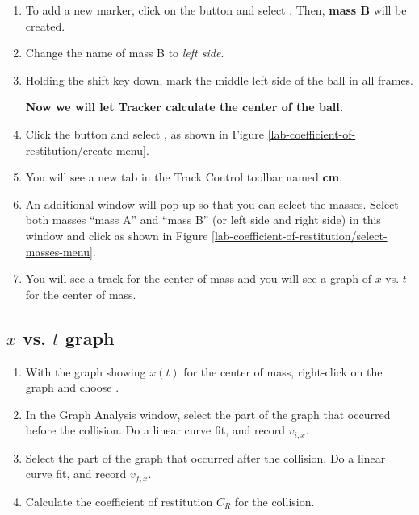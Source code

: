 \begin{enumerate}

	{\bf Now we will mark the left side of the ball.}
	
	\item To add a new marker, click on the  button and select . Then, {\bf mass B} will be created. 
			
	\item Change the name of mass B to \emph{left side}.

	\item Holding the shift key down, mark the middle left side of the ball in all frames.
	
	{\bf Now we will let Tracker calculate the center of the ball.}

	\item  Click the  button and select , as shown in Figure \ref{lab-coefficient-of-restitution/create-menu}.
	

	\item You will see a new tab in the Track Control toolbar named {\bf cm}.
	
	\item An additional window will pop up so that you can select the masses. Select both masses ``mass A'' and ``mass B'' (or left side and right side) in this window and click  as shown in Figure \ref{lab-coefficient-of-restitution/select-masses-menu}.
	
		
	\item You will see a track for the center of mass and you will see a graph of $x$ vs. $t$ for the center of mass. 
		

\end{enumerate}

\analysis

\subsection*{$x$ vs. $t$ graph}

\begin{enumerate}
	\item	With the graph showing $x(t)$ for the center of mass, right-click on the graph and choose .
	\item In the Graph Analysis window, select the part of the graph that occurred before the collision. Do a linear curve fit, and record $v_{i,x}$.
	\item Select the part of the graph that occurred after the collision. Do a linear curve fit, and record $v_{f,x}$.
	\item Calculate the coefficient of restitution $C_R$ for the collision.
\end{enumerate}

